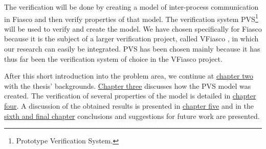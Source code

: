 The verification will be done by creating a model of inter-process communication in Fiasco and then verify properties of that model. The verification system PVS\footnote{Prototype Verification System.} will be used to verify and create the model. We have chosen specifically for Fiasco because it is the subject of a larger verification project, called VFiasco \cite{hohmuth03applying}, in which our research can easily be integrated. PVS has been chosen mainly because it has thus far been the verification system of choice in the VFiasco project.\emptyline

After this short introduction into the problem area, we continue at \hyperlink{backgrounds}{chapter two} with the thesis' backgrounds. \hyperlink{model_creation}{Chapter three} discusses how the PVS model was created. The verification of several properties of the model is detailed in \hyperlink{model_verification}{chapter four}. A discussion of the obtained results is presented in \hyperlink{discussion}{chapter five} and in the \hyperlink{conclusions}{sixth and final chapter} conclusions and suggestions for future work are presented.